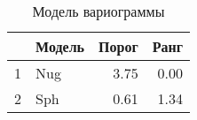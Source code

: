 \begin{table}[H]
\centering
\begin{tabular}{rlrr}
  \hline
 & Модель & Порог & Ранг \\ 
  \hline
1 & Nug & 3.75 & 0.00 \\ 
  2 & Sph & 0.61 & 1.34 \\ 
   \hline
\end{tabular}
\caption{Модель вариограммы} 
\label{table:manual_model}
\end{table}
